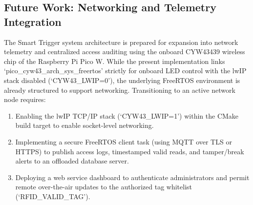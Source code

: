 \subsection{Future Work: Networking and Telemetry Integration}
The Smart Trigger system architecture is prepared for expansion into network telemetry and centralized access auditing using the onboard CYW43439 wireless chip of the Raspberry Pi Pico W. While the present implementation links `pico\_cyw43\_arch\_sys\_freertos' strictly for onboard LED control with the lwIP stack disabled (`CYW43\_LWIP=0'), the underlying FreeRTOS environment is already structured to support networking. Transitioning to an active network node requires:
\begin{enumerate}
    \item Enabling the lwIP TCP/IP stack (`CYW43\_LWIP=1') within the CMake build target to enable socket-level networking.
    \item Implementing a secure FreeRTOS client task (using MQTT over TLS or HTTPS) to publish access logs, timestamped valid reads, and tamper/break alerts to an offloaded database server.
    \item Deploying a web service dashboard to authenticate administrators and permit remote over-the-air updates to the authorized tag whitelist (`RFID\_VALID\_TAG').
\end{enumerate}
